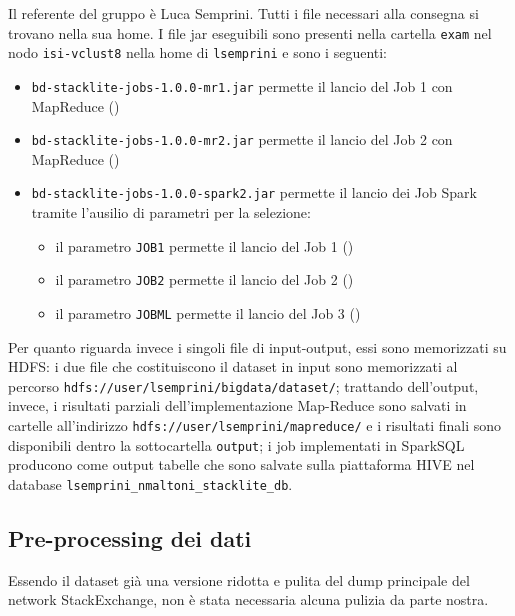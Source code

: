 \documentclass[
  a4paper,            %
  10pt                %
]{article}
\begin{document}
  Il referente del gruppo è Luca Semprini.
  Tutti i file necessari alla consegna si trovano nella sua home.
  I file jar eseguibili sono presenti nella cartella \texttt{exam} nel nodo \texttt{isi-vclust8} nella home di \texttt{lsemprini} e sono i seguenti:
  \begin{itemize}
    \item
      \texttt{bd-stacklite-jobs-1.0.0-mr1.jar} permette il lancio del Job 1 con MapReduce ()
    \item
      \texttt{bd-stacklite-jobs-1.0.0-mr2.jar} permette il lancio del Job 2 con MapReduce ()
    \item
      \texttt{bd-stacklite-jobs-1.0.0-spark2.jar} permette il lancio dei Job Spark tramite l'ausilio di parametri per la selezione:
      \begin{itemize}
        \item il parametro \texttt{JOB1} permette il lancio del Job 1 ()
        \item il parametro \texttt{JOB2} permette il lancio del Job 2 ()
        \item il parametro \texttt{JOBML} permette il lancio del Job 3 ()
      \end{itemize}
  \end{itemize}

  Per quanto riguarda invece i singoli file di input-output, essi sono memorizzati su HDFS\@:
  i due file che costituiscono il dataset in input sono memorizzati al percorso \texttt{hdfs://user/lsemprini/bigdata/dataset/};
  trattando dell'output, invece, i risultati parziali dell'implementazione Map-Reduce sono salvati in cartelle all'indirizzo \texttt{hdfs://user/lsemprini/mapreduce/}
  e i risultati finali sono disponibili dentro la sottocartella \texttt{output};
  i job implementati in SparkSQL producono come output tabelle che sono salvate sulla piattaforma HIVE nel database \texttt{lsemprini\_nmaltoni\_stacklite\_db}.

  \subsection{Pre-processing dei dati}\label{subsec:preprocessing}

  Essendo il dataset già una versione ridotta e pulita del dump principale del network StackExchange, non è stata necessaria alcuna pulizia da parte nostra.
\end{document}

